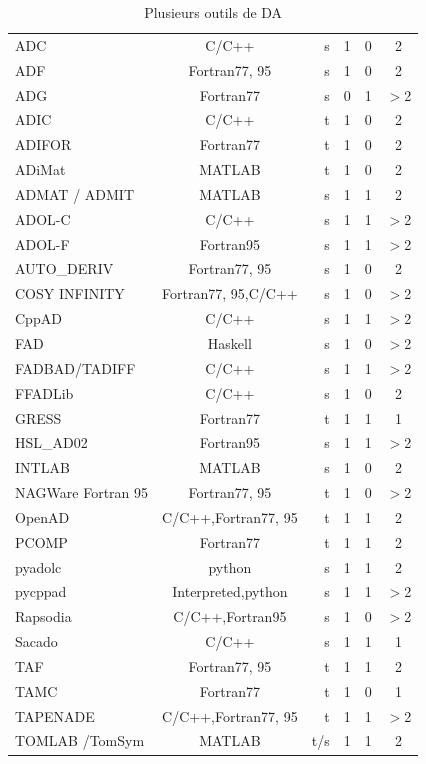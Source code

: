 \begin{table}[H]
\begin{center}
{\begin{tabular}{ | l | c | r | c | c | c | }
\hline
 ADC &  C/C++ &  s  & 1 & 0 & 2 \\
 ADF  & Fortran77, 95 &  s  & 1 & 0 & 2 \\
 ADG  & Fortran77 & s  & 0 & 1 & $>$2  \\
 ADIC  & C/C++ & t  & 1 & 0 & 2 \\
 ADIFOR  & Fortran77 & t  & 1 & 0 &  2\\
 ADiMat  & MATLAB &  t & 1 & 0 & 2 \\
 ADMAT / ADMIT  & MATLAB & s  & 1 & 1 & 2\\
 ADOL-C  & C/C++ & s  & 1 & 1 & $>$2 \\
 ADOL-F  & Fortran95 & s  & 1 & 1 & $>$2\\
 AUTO\_DERIV  & Fortran77, 95 & s  & 1 & 0 & 2\\
 COSY INFINITY  & Fortran77, 95,C/C++ & s  & 1 & 0 &$>$2 \\
 CppAD  & C/C++ & s  & 1 & 1 & $>$2 \\
 FAD  & Haskell & s  & 1 & 0 & $>$2  \\
 FADBAD/TADIFF  & C/C++ & s  & 1 & 1 & $>$2 \\
 FFADLib  & C/C++ & s  & 1 & 0 & 2 \\
 GRESS  & Fortran77 & t  & 1 & 1 & 1  \\
 HSL\_AD02  & Fortran95 & s  & 1 & 1 & $>$2 \\
 INTLAB  & MATLAB & s  & 1 & 0 & 2 \\
 NAGWare Fortran 95   & Fortran77, 95 & t  & 1 & 0 & $>$2 \\
 OpenAD  & C/C++,Fortran77, 95 &  t  & 1 & 1 & 2  \\
 PCOMP  & Fortran77 & t  & 1 & 1 & 2 \\
 pyadolc  & python & s  & 1 & 1 & 2 \\
 pycppad  & Interpreted,python & s  & 1 & 1 & $>$2\\
 Rapsodia  & C/C++,Fortran95 & s  & 1 & 0 &  $>$2\\
 Sacado  & C/C++ & s  & 1 & 1 & 1 \\
 TAF  & Fortran77, 95 & t  & 1 & 1 & 2 \\
 TAMC  & Fortran77 & t  & 1 & 0 & 1 \\
 TAPENADE  & C/C++,Fortran77, 95 & t  & 1 & 1 & $>$2 \\
 TOMLAB /TomSym  & MATLAB & t/s & 1 & 1 & 2\\
\hline


\end{tabular}
}
	\end{center}
	\caption{Plusieurs outils de DA}
	\label{tab:outils}
\end{table}





